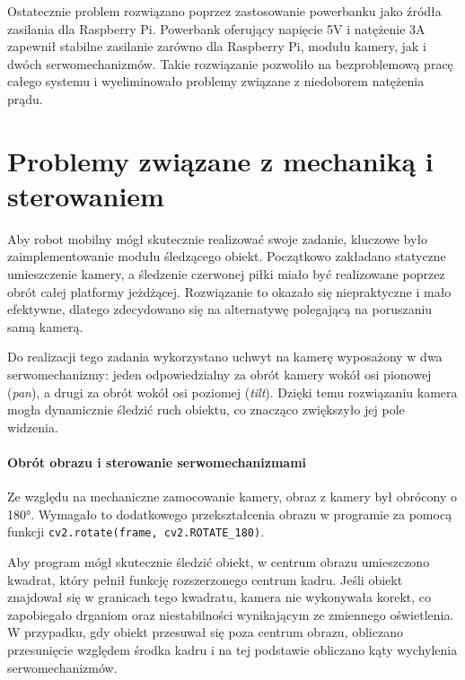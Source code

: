 \documentclass[a4paper,twoside,12pt]{book}
\begin{document}
Ostatecznie problem rozwiązano poprzez zastosowanie powerbanku jako źródła zasilania dla Raspberry Pi. Powerbank oferujący napięcie 5V i natężenie 3A zapewnił stabilne zasilanie zarówno dla Raspberry Pi, modułu kamery, jak i dwóch serwomechanizmów. Takie rozwiązanie pozwoliło na bezproblemową pracę całego systemu i wyeliminowało problemy związane z niedoborem natężenia prądu.


\newpage
\section{Problemy związane z mechaniką i sterowaniem}

Aby robot mobilny mógł skutecznie realizować swoje zadanie, kluczowe było zaimplementowanie modułu śledzącego obiekt. Początkowo zakładano statyczne umieszczenie kamery, a śledzenie czerwonej piłki miało być realizowane poprzez obrót całej platformy jeżdżącej. Rozwiązanie to okazało się niepraktyczne i mało efektywne, dlatego zdecydowano się na alternatywę polegającą na poruszaniu samą kamerą.

Do realizacji tego zadania wykorzystano uchwyt na kamerę wyposażony w dwa serwomechanizmy: jeden odpowiedzialny za obrót kamery wokół osi pionowej (\textit{pan}), a drugi za obrót wokół osi poziomej (\textit{tilt}). Dzięki temu rozwiązaniu kamera mogła dynamicznie śledzić ruch obiektu, co znacząco zwiększyło jej pole widzenia.

\paragraph{Obrót obrazu i sterowanie serwomechanizmami} 
Ze względu na mechaniczne zamocowanie kamery, obraz z kamery był obrócony o 180°. Wymagało to dodatkowego przekształcenia obrazu w programie za pomocą funkcji \texttt{cv2.rotate(frame, cv2.ROTATE\_180)}.

Aby program mógł skutecznie śledzić obiekt, w centrum obrazu umieszczono kwadrat, który pełnił funkcję rozszerzonego centrum kadru. Jeśli obiekt znajdował się w granicach tego kwadratu, kamera nie wykonywała korekt, co zapobiegało drganiom oraz niestabilności wynikającym ze zmiennego oświetlenia. W przypadku, gdy obiekt przesuwał się poza centrum obrazu, obliczano przesunięcie względem środka kadru i na tej podstawie obliczano kąty wychylenia serwomechanizmów.
\end{document}
